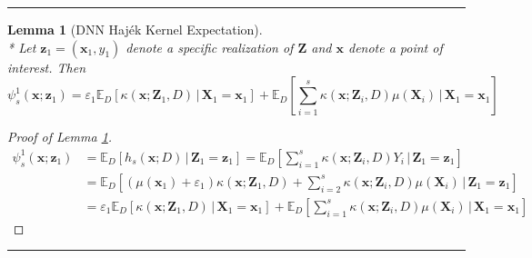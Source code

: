 \documentclass[letterpaper,10pt]{article}
\numberwithin{equation}{section}
\numberwithin{thm}{section}
\newtheorem{lem}{Lemma}
\numberwithin{lem}{section}
\numberwithin{cor}{section}
\newcommand{\E}{\mathbb{E}}
\newcommand{\1}{\mathbbm{1}}
\begin{document}
\hrule

\begin{lem}[DNN Haj\'ek Kernel Expectation]\label{lem:psi_s_1}\mbox{}\\*
	Let $\mathbf{z}_1 = (\mathbf{x}_1, y_1)$ denote a specific realization of $\mathbf{Z}$ and $\mathbf{x}$ denote a point of interest.
	Then
	\begin{equation}
		\psi_{s}^{1}\left(\mathbf{x}; \mathbf{z}_1\right)
		= \varepsilon_1 \E_D\left[\kappa\left(\mathbf{x}; \mathbf{Z}_1, D\right)\, \Big| \, \mathbf{X}_1 = \mathbf{x}_1 \right]
		+ \E_{D}\left[\sum_{i = 1}^{s} \kappa\left(\mathbf{x}; \mathbf{Z}_i, D\right) \mu(\mathbf{X}_i)\, \Big| \, \mathbf{X}_1 = \mathbf{x}_1 \right]
	\end{equation}
\end{lem}

\begin{proof}[Proof of Lemma \ref{lem:psi_s_1}]
	\begin{equation}
		\begin{aligned}
			\psi_{s}^{1}\left(\mathbf{x}; \mathbf{z}_1\right)
			 & = \E_{D}\left[h_{s}\left(\mathbf{x}; D\right) \, | \, \mathbf{Z}_1 = \mathbf{z}_1 \right]
			= \E_{D}\left[\sum_{i = 1}^{s} \kappa\left(\mathbf{x}; \mathbf{Z}_i, D\right) Y_i \, \Big| \, \mathbf{Z}_1 = \mathbf{z}_1 \right]  \\
			 & = \E_{D}\left[\left(\mu(\mathbf{x}_1) + \varepsilon_1\right)\kappa\left(\mathbf{x}; \mathbf{Z}_1, D\right)
			+ \sum_{i = 2}^{s} \kappa\left(\mathbf{x}; \mathbf{Z}_i, D\right) \mu(\mathbf{X}_i)\, \Big| \, \mathbf{Z}_1 = \mathbf{z}_1 \right] \\
			 & = \varepsilon_1 \E_D\left[\kappa\left(\mathbf{x}; \mathbf{Z}_1, D\right)\, \Big| \, \mathbf{X}_1 = \mathbf{x}_1 \right]
			+ \E_{D}\left[\sum_{i = 1}^{s} \kappa\left(\mathbf{x}; \mathbf{Z}_i, D\right) \mu(\mathbf{X}_i)\, \Big| \, \mathbf{X}_1 = \mathbf{x}_1 \right]
		\end{aligned}
	\end{equation}
\end{proof}

\hrule
\end{document}
